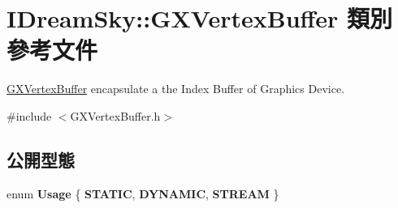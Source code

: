 \hypertarget{class_i_dream_sky_1_1_g_x_vertex_buffer}{}\section{I\+Dream\+Sky\+:\+:G\+X\+Vertex\+Buffer 類別 參考文件}
\label{class_i_dream_sky_1_1_g_x_vertex_buffer}


\hyperlink{class_i_dream_sky_1_1_g_x_vertex_buffer}{G\+X\+Vertex\+Buffer} encapsulate a the Index Buffer of Graphics Device.  




{\ttfamily \#include $<$G\+X\+Vertex\+Buffer.\+h$>$}

\subsection*{公開型態}
\begin{DoxyCompactItemize}
\item 
enum {\bfseries Usage} \{ {\bfseries S\+T\+A\+T\+IC}, 
{\bfseries D\+Y\+N\+A\+M\+IC}, 
{\bfseries S\+T\+R\+E\+AM}
 \}\hypertarget{class_i_dream_sky_1_1_g_x_vertex_buffer_a4dd26d0a9043a174ffc20214994ea341}{}\label{class_i_dream_sky_1_1_g_x_vertex_buffer_a4dd26d0a9043a174ffc20214994ea341}

\end{DoxyCompactItemize}
